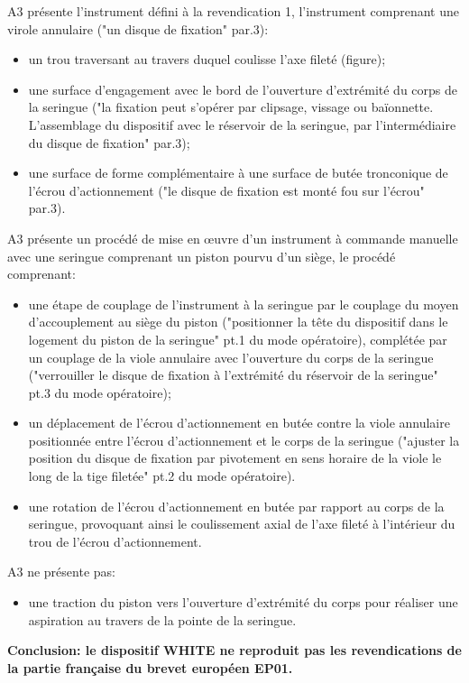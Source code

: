 A3 présente l'instrument défini à la revendication 1, l'instrument comprenant
une virole annulaire ("un disque de fixation" par.3):
\begin{itemize}
    \item un trou traversant au travers duquel coulisse l'axe fileté (figure);
    \item une surface d'engagement avec le bord de l'ouverture d'extrémité
    du corps de la seringue ("la fixation peut s'opérer par clipsage,
    vissage ou baïonnette. L'assemblage du dispositif avec le réservoir de
    la seringue, par l'intermédiaire du disque de fixation" par.3);
    \item une surface de forme complémentaire à une surface de butée tronconique
    de l'écrou d'actionnement ("le disque de fixation est monté fou sur l'écrou"
    par.3).\\
\end{itemize}

A3 présente un procédé de mise en œuvre d'un instrument à commande manuelle
avec une seringue comprenant un piston pourvu d'un siège, le procédé comprenant:
\begin{itemize}
    \item une étape de couplage de l'instrument à la seringue par le couplage
    du moyen d'accouplement au siège du piston ("positionner la tête du dispositif
    dans le logement du piston de la seringue" pt.1 du mode opératoire), complétée
    par un couplage de la viole annulaire avec l'ouverture du corps de la seringue
    ("verrouiller le disque de fixation à l'extrémité du réservoir de la seringue"
    pt.3 du mode opératoire);
    \item un déplacement de l'écrou d'actionnement en butée contre la viole annulaire
    positionnée entre l'écrou d'actionnement et le corps de la seringue
    ("ajuster la position du disque de fixation par pivotement en sens horaire
    de la viole le long de la tige filetée" pt.2 du mode opératoire).
    \item une rotation de l'écrou d'actionnement en butée par rapport au corps
    de la seringue, provoquant ainsi le coulissement axial de l'axe fileté à
    l'intérieur du trou de l'écrou d'actionnement.\\
\end{itemize}

A3 ne présente pas:
\begin{itemize}
   \item une traction du piston vers
    l'ouverture d'extrémité du corps pour réaliser une aspiration au travers de la
    pointe de la seringue.\\
\end{itemize}

\textbf{Conclusion: le dispositif WHITE ne reproduit pas les revendications
de la partie française du brevet européen EP01.}